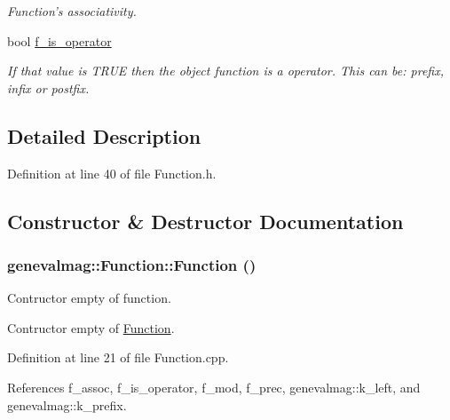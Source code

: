 \begin{DoxyCompactItemize}
\begin{DoxyCompactList}\small\item\em Function's associativity. \item\end{DoxyCompactList}\item 
bool \hyperlink{classgenevalmag_1_1Function_a681af241838253c6b001e92541be7b4c}{f\_\-is\_\-operator}
\begin{DoxyCompactList}\small\item\em If that value is TRUE then the object function is a operator. This can be: prefix, infix or postfix. \item\end{DoxyCompactList}\end{DoxyCompactItemize}


\subsection{Detailed Description}


Definition at line 40 of file Function.h.



\subsection{Constructor \& Destructor Documentation}
\hypertarget{classgenevalmag_1_1Function_a88af7b2a3947048e53e0bc9c1d071ad9}{
\subsubsection[{Function}]{\setlength{\rightskip}{0pt plus 5cm}genevalmag::Function::Function ()}}
\label{classgenevalmag_1_1Function_a88af7b2a3947048e53e0bc9c1d071ad9}
Contructor empty of function.

Contructor empty of \hyperlink{classgenevalmag_1_1Function}{Function}. 

Definition at line 21 of file Function.cpp.



References f\_\-assoc, f\_\-is\_\-operator, f\_\-mod, f\_\-prec, genevalmag::k\_\-left, and genevalmag::k\_\-prefix.

